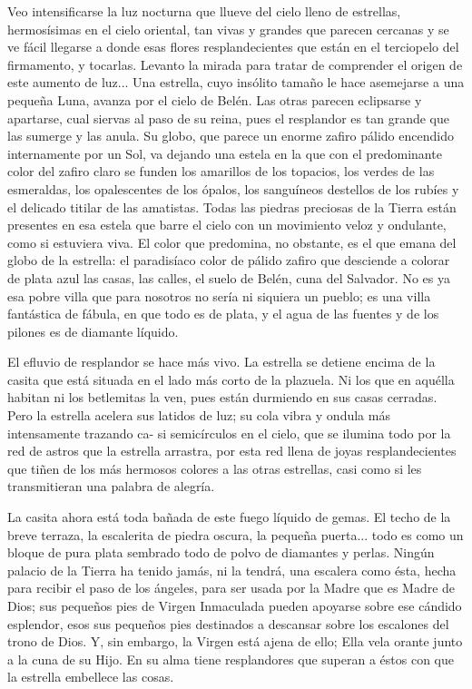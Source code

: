 \documentclass[12pt]{book} %
\begin{document}
Veo intensificarse la luz nocturna que llueve del cielo lleno de estrellas, hermosísimas en el cielo oriental, tan vivas y grandes que parecen cercanas y se ve fácil llegarse a donde esas flores resplandecientes que están en el terciopelo del firmamento, y tocarlas. Levanto la mirada para tratar de comprender el origen de este aumento de luz... Una estrella, cuyo insólito tamaño le hace asemejarse a una pequeña Luna, avanza por el cielo de Belén. Las otras parecen eclipsarse y apartarse, cual siervas al paso de su reina, pues el resplandor es tan grande que las sumerge y las anula. Su globo, que parece un enorme zafiro pálido encendido internamente por un Sol, va dejando una estela en la que con el predominante color del zafiro claro se funden los amarillos de los topacios, los verdes de las esmeraldas, los opalescentes de los ópalos, los sanguíneos destellos de los rubíes y el delicado titilar de las amatistas. Todas las piedras preciosas de la Tierra están presentes en esa estela que barre el cielo con un movimiento veloz y ondulante, como si estuviera viva. El color que predomina, no obstante, es el que emana del globo de la estrella: el paradisíaco color de pálido zafiro que desciende a colorar de plata azul las casas, las calles, el suelo de Belén, cuna del Salvador. No es ya esa pobre villa que para nosotros no sería ni siquiera un pueblo; es una villa fantástica de fábula, en que todo es de plata, y el agua de las fuentes y de los pilones es de diamante líquido. 

El efluvio de resplandor se hace más vivo. La estrella se detiene encima de la casita que está situada en el lado más corto de la plazuela. Ni los que en aquélla habitan ni los betlemitas la ven, pues están durmiendo en sus casas cerradas. Pero la estrella acelera sus latidos de luz; su cola vibra y ondula más intensamente trazando ca- si semicírculos en el cielo, que se ilumina todo por la red de astros que la estrella arrastra, por esta red llena de joyas resplandecientes que tiñen de los más hermosos colores a las otras estrellas, casi como si les transmitieran una palabra de alegría. 

La casita ahora está toda bañada de este fuego líquido de gemas. El techo de la breve terraza, la escalerita de piedra oscura, la pequeña puerta... todo es como un bloque de pura plata sembrado todo de polvo de diamantes y perlas. Ningún palacio de la Tierra ha tenido jamás, ni la tendrá, una escalera como ésta, hecha para recibir el paso de los ángeles, para ser usada por la Madre que es Madre de Dios; sus pequeños pies de Virgen Inmaculada pueden apoyarse sobre ese cándido esplendor, esos sus pequeños pies destinados a descansar sobre los escalones del trono de Dios. Y, sin embargo, la Virgen está ajena de ello; Ella vela orante junto a la cuna de su Hijo. En su alma tiene resplandores que superan a éstos con que la estrella embellece las cosas. 
\end{document}
